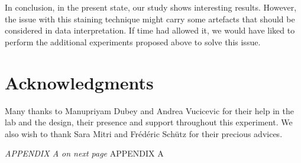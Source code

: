 \documentclass[a4paper, 10pt, conference]{ieeeconf}   %
\begin{document}
In conclusion, in the present state, our study shows interesting results. However, the issue with this staining technique might carry some artefacts that should be considered in data interpretation. If time had allowed it, we would have liked to perform the additional experiments proposed above to solve this issue.
 











\section*{Acknowledgments}
Many thanks to Manupriyam Dubey and Andrea Vucicevic for their help in the lab and the design, their presence and support throughout this experiment. We also wish to thank Sara Mitri and Frédéric Schütz for their precious advices. 



\printbibliography
\vspace*{\fill}
\textit{APPENDIX A on next page}
\clearpage
APPENDIX A
\end{document}
